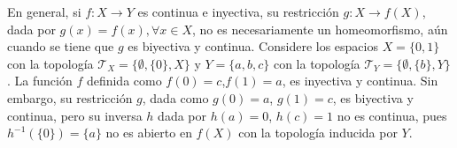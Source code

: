 
\begin{remark}
En general, si $f : X \longrightarrow Y$ es continua e inyectiva, su restricción $g : X \longrightarrow f(X)$, dada por $g(x) = f(x), \forall x \in X$, no es necesariamente un homeomorfismo, aún cuando se tiene que $g$ es biyectiva y continua. Considere los espacios $X = \{ 0,1 \}$ con la topología $\mathcal{T}_X = \{ \emptyset, \{ 0 \}, X \}$ y $Y = \{ a, b, c \}$ con la topología $\mathcal{T}_Y = \{ \emptyset, \{ b \}, Y \}$. La función $f$ definida como $f(0) = c$,$f(1) = a$, es inyectiva y continua. Sin embargo, su restricción $g$, dada como $g(0) = a$, $g(1) = c$, es biyectiva y continua, pero su inversa $h$ dada por $h(a) = 0$, $h(c) = 1$ no es continua, pues $h^{-1}(\{ 0 \}) = \{ a \}$ no es abierto en $f(X)$ con la topología inducida por $Y$.
\end{remark}
